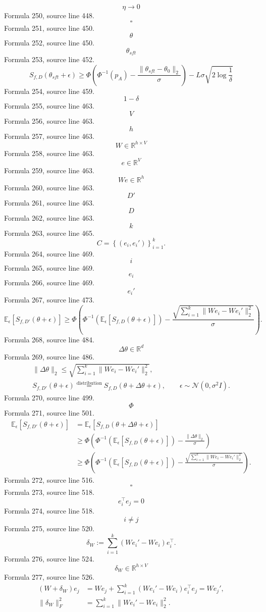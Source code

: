 \documentclass{ctexart}
\begin{document}
\[\eta\to0\]
Formula 250, source line 448.
\[\square\]
Formula 251, source line 450.
\[\theta\]
Formula 252, source line 450.
\[\theta_{sft}\]
Formula 253, source line 452.
\[
S_{f,D}(\theta_{sft}+\epsilon)
\geq
\Phi\left(\Phi^{-1}(p_A)-\frac{\|\theta_{sft}-\theta_0\|_2}{\sigma}\right)
-L\sigma\sqrt{2\log\frac1\delta}
\]
Formula 254, source line 459.
\[1-\delta\]
Formula 255, source line 463.
\[V\]
Formula 256, source line 463.
\[h\]
Formula 257, source line 463.
\[W\in\mathbb R^{h\times V}\]
Formula 258, source line 463.
\[e\in\mathbb R^V\]
Formula 259, source line 463.
\[We\in\mathbb R^h\]
Formula 260, source line 463.
\[D'\]
Formula 261, source line 463.
\[D\]
Formula 262, source line 463.
\[k\]
Formula 263, source line 465.
\[
C=\left\{(e_i,e_i')\right\}_{i=1}^{k}.
\]
Formula 264, source line 469.
\[i\]
Formula 265, source line 469.
\[e_i\]
Formula 266, source line 469.
\[e_i'\]
Formula 267, source line 473.
\[
\mathbb E_\epsilon[S_{f,D'}(\theta+\epsilon)]
\geq
\Phi\left(
\Phi^{-1}\left(\mathbb E_\epsilon[S_{f,D}(\theta+\epsilon)]\right)
-\frac{\sqrt{\sum\limits_{i=1}^{k}\|We_i-We_i'\|_2^2}}{\sigma}
\right).
\]
Formula 268, source line 484.
\[\Delta\theta\in\mathbb R^d\]
Formula 269, source line 486.
\[
\begin{gathered}
\|\Delta\theta\|_2
\leq\sqrt{\sum\limits_{i=1}^{k}\|We_i-We_i'\|_2^2},\\
S_{f,D'}(\theta+\epsilon)
\overset{\mathrm{distribution}}{=}
S_{f,D}(\theta+\Delta\theta+\epsilon),
\qquad\epsilon\sim\mathcal N(0,\sigma^2I).
\end{gathered}
\]
Formula 270, source line 499.
\[\Phi\]
Formula 271, source line 501.
\[
\begin{aligned}
\mathbb E_\epsilon[S_{f,D'}(\theta+\epsilon)]
&=\mathbb E_\epsilon[S_{f,D}(\theta+\Delta\theta+\epsilon)]\\
&\geq\Phi\left(
\Phi^{-1}\left(\mathbb E_\epsilon[S_{f,D}(\theta+\epsilon)]\right)
-\frac{\|\Delta\theta\|_2}{\sigma}
\right)\\
&\geq\Phi\left(
\Phi^{-1}\left(\mathbb E_\epsilon[S_{f,D}(\theta+\epsilon)]\right)
-\frac{\sqrt{\sum\limits_{i=1}^{k}\|We_i-We_i'\|_2^2}}{\sigma}
\right).
\end{aligned}
\]
Formula 272, source line 516.
\[\square\]
Formula 273, source line 518.
\[e_i^\top e_j=0\]
Formula 274, source line 518.
\[i\neq j\]
Formula 275, source line 520.
\[
\delta_W:=\sum\limits_{i=1}^{k}(We_i'-We_i)e_i^\top.
\]
Formula 276, source line 524.
\[\delta_W\in\mathbb R^{h\times V}\]
Formula 277, source line 526.
\[
\begin{aligned}
(W+\delta_W)e_j
&=We_j+\sum\limits_{i=1}^{k}(We_i'-We_i)e_i^\top e_j
=We_j',\\
\|\delta_W\|_F^2
&=\sum\limits_{i=1}^{k}\|We_i'-We_i\|_2^2.
\end{aligned}
\]
\end{document}

